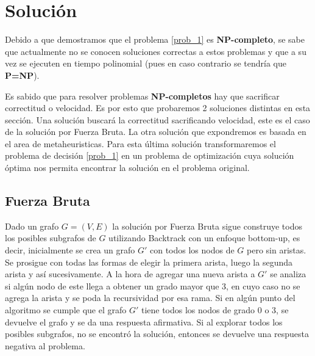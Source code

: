 \documentclass{article}
\begin{document}
\section{Solución}

Debido a que demostramos que el problema \ref{prob_1} es \textbf{NP-completo}, se sabe que actualmente no se conocen soluciones correctas a estos problemas y
que a su vez se ejecuten en tiempo polinomial (pues en caso contrario se tendría que \textbf{P=NP}).

Es sabido que para resolver problemas \textbf{NP-completos} hay que sacrificar correctitud o velocidad. Es por esto que probaremos 2 soluciones distintas en esta sección.
Una solución buscará la correctitud sacrificando velocidad, este es el caso de la solución por Fuerza Bruta. La otra solución que expondremos es basada en el area de metaheuristicas.
Para esta última solución transformaremos el problema de decisión \ref{prob_1} en un problema de optimización cuya solución óptima nos permita
encontrar la solución en el problema original.

\subsection{Fuerza Bruta}

Dado un grafo $G=(V,E)$ la solución por Fuerza Bruta sigue construye todos los posibles subgrafos de $G$ utilizando Backtrack con un enfoque bottom-up, es decir,
inicialmente se crea un grafo $G'$ con todos los nodos de $G$ pero sin aristas. Se prosigue con todas las formas de elegir la primera arista, luego la segunda arista y así
sucesivamente. A la hora de agregar una nueva arista a $G'$ se analiza si algún nodo de este llega a obtener un grado mayor que 3, en cuyo caso no se agrega la arista y se poda
la recursividad por esa rama. Si en algún punto del algoritmo se cumple que el grafo $G'$ tiene todos los nodos de grado 0 o 3, se devuelve el grafo y se da una respuesta afirmativa.
Si al explorar todos los posibles subgrafos, no se encontró la solución, entonces se devuelve una respuesta negativa al problema.
\end{document}
